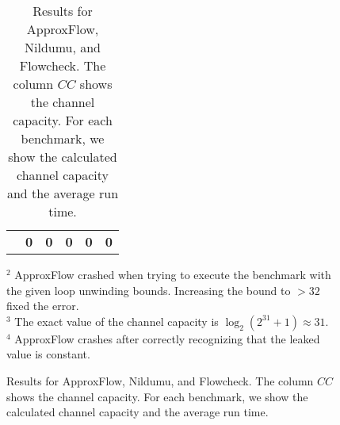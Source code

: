 \begin{figure}
\begin{table}[H]
\begin{tabular}{rr|rr|rr}
                                      & \textbf{0}    & \textbf{0}                      & \textbf{0}                      & \textbf{0 }            & \textbf{0}                        
\end{tabular}
\caption{Results for ApproxFlow, Nildumu, and Flowcheck. The column $CC$ shows the channel capacity. For each benchmark, we show the calculated channel capacity and the average run time.}\label{tab:othertools}
\end{table}
{\footnotesize $^2$ ApproxFlow crashed when trying to execute the benchmark with the given loop unwinding bounds. Increasing the bound to $> 32$ fixed the error.}\\
{\footnotesize $^3$ The exact value of the channel capacity is $\log_2 (2^{31} + 1) \approx 31$.}\\
{\footnotesize $^4$ ApproxFlow crashes after correctly recognizing that the leaked value is constant.}
\end{figure}

